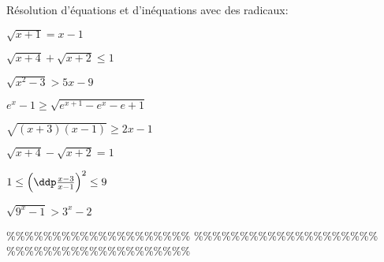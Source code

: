 



\begin{exercice}  \;
R\'esolution d'\'equations et d'in\'equations avec des radicaux:
\begin{enumerate}
\begin{minipage}[t]{0.45\textwidth}
\item $\sqrt{x+1}=x-1$
\item $\sqrt{x+4}+\sqrt{x+2}\leq 1$
\item $\sqrt{x^2-3}>5x-9$
\item $e^x-1\geq \sqrt{e^{x+1}-e^x-e+1}$
\item $\sqrt{(x+3)(x-1)}\geq 2x-1$
\end{minipage}
\begin{minipage}[t]{0.45\textwidth}
\item $\sqrt{x+4}-\sqrt{x+2}=1$
\item $1\leq \left(\ddp\frac{x-3}{x-1}   \right)^2\leq 9$
\item $\sqrt{9^x-1}>3^x-2$
\end{minipage}
\end{enumerate}
\end{exercice}


\%\%\%\%\%\%\%\%\%\%\%\%\%\%\%\%\%\%\%\%
\%\%\%\%\%\%\%\%\%\%\%\%\%\%\%\%\%\%\%\%
\%\%\%\%\%\%\%\%\%\%\%\%\%\%\%\%\%\%\%\%





